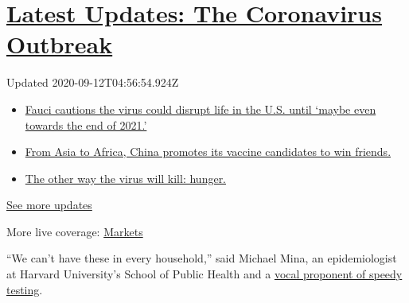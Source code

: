 \hypertarget{latest-updates-the-coronavirus-outbreak}{%
\section{\texorpdfstring{\href{https://www.nytimes3xbfgragh.onion/2020/09/11/world/covid-19-coronavirus.html?action=click\&pgtype=Article\&state=default\&region=MAIN_CONTENT_1\&context=storylines_live_updates}{Latest
Updates: The Coronavirus
Outbreak}}{Latest Updates: The Coronavirus Outbreak}}\label{latest-updates-the-coronavirus-outbreak}}

Updated 2020-09-12T04:56:54.924Z

\begin{itemize}
\tightlist
\item
  \href{https://www.nytimes3xbfgragh.onion/2020/09/11/world/covid-19-coronavirus.html?action=click\&pgtype=Article\&state=default\&region=MAIN_CONTENT_1\&context=storylines_live_updates\#link-dfb8a16}{Fauci
  cautions the virus could disrupt life in the U.S. until `maybe even
  towards the end of 2021.'}
\item
  \href{https://www.nytimes3xbfgragh.onion/2020/09/11/world/covid-19-coronavirus.html?action=click\&pgtype=Article\&state=default\&region=MAIN_CONTENT_1\&context=storylines_live_updates\#link-7104d154}{From
  Asia to Africa, China promotes its vaccine candidates to win friends.}
\item
  \href{https://www.nytimes3xbfgragh.onion/2020/09/11/world/covid-19-coronavirus.html?action=click\&pgtype=Article\&state=default\&region=MAIN_CONTENT_1\&context=storylines_live_updates\#link-393ad215}{The
  other way the virus will kill: hunger.}
\end{itemize}

\href{https://www.nytimes3xbfgragh.onion/2020/09/11/world/covid-19-coronavirus.html?action=click\&pgtype=Article\&state=default\&region=MAIN_CONTENT_1\&context=storylines_live_updates}{See
more updates}

More live coverage:
\href{https://www.nytimes3xbfgragh.onion/live/2020/09/11/business/stock-market-today-coronavirus?action=click\&pgtype=Article\&state=default\&region=MAIN_CONTENT_1\&context=storylines_live_updates}{Markets}

``We can't have these in every household,'' said Michael Mina, an
epidemiologist at Harvard University's School of Public Health and a
\href{https://www.nytimes3xbfgragh.onion/2020/07/03/opinion/coronavirus-tests.html}{vocal
proponent of speedy testing}.

